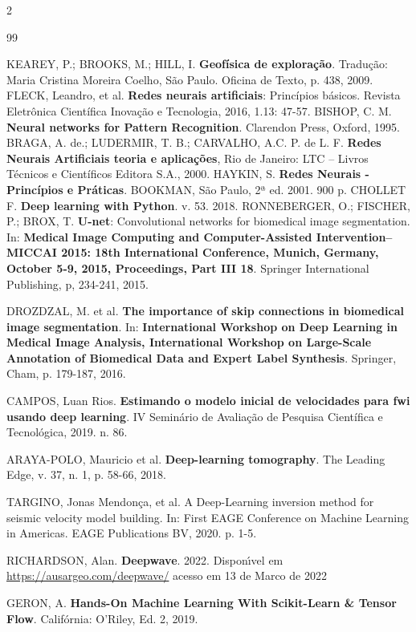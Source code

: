 \documentclass[a4paper,twoside,12pt]{article}
\begin{document}
\begin{multicols}{2}
\begin{thebibliography}{99}

 KEAREY, P.; BROOKS, M.; HILL, I. \textbf{Geofísica de exploração}. Tradução: Maria Cristina Moreira Coelho, São Paulo. Oficina de Texto, p. 438, 2009.
FLECK, Leandro, et al. \textbf{Redes neurais artificiais}: Princípios básicos. Revista Eletrônica Científica Inovação e Tecnologia, 2016, 1.13: 47-57.
BISHOP, C. M. \textbf{Neural networks for Pattern Recognition}. Clarendon Press, Oxford, 1995.
BRAGA, A. de.; LUDERMIR, T. B.; CARVALHO, A.C. P. de L. F. \textbf{Redes Neurais Artificiais teoria e aplicações}, Rio de Janeiro: LTC – Livros Técnicos e Científicos Editora S.A., 2000.
HAYKIN, S. \textbf{Redes Neurais - Princípios e Práticas}. BOOKMAN, São Paulo, 2ª ed. 2001. 900 p.
 CHOLLET F. \textbf{Deep learning with Python}. v. 53. 2018.
 RONNEBERGER, O.; FISCHER, P.; BROX, T. \textbf{U-net}: Convolutional networks for biomedical image segmentation. In: \textbf{Medical Image Computing and Computer-Assisted Intervention–MICCAI 2015: 18th International Conference, Munich, Germany, October 5-9, 2015, Proceedings, Part III 18}. Springer International Publishing, p, 234-241, 2015.

 DROZDZAL, M. et al. \textbf{The importance of skip connections in biomedical image segmentation}. In: \textbf{International Workshop on Deep Learning in Medical Image Analysis, International Workshop on Large-Scale Annotation of Biomedical Data and Expert Label Synthesis}. Springer, Cham, p. 179-187, 2016.  

CAMPOS, Luan Rios. \textbf{Estimando o modelo inicial de velocidades para fwi usando deep learning}. IV Seminário de Avaliação de Pesquisa Científica e Tecnológica, 2019. n. 86.



ARAYA-POLO, Mauricio et al. \textbf{Deep-learning tomography}. The Leading Edge, v. 37, n. 1, p. 58-66, 2018.

TARGINO, Jonas Mendonça, et al. A Deep-Learning inversion method for seismic velocity model building. In: First EAGE Conference on Machine Learning in Americas. EAGE Publications BV, 2020. p. 1-5.



 RICHARDSON, Alan. \textbf{Deepwave}. 2022. Dispon{\'\i}vel em \url{https://ausargeo.com/deepwave/} acesso em 13 de Marco de 2022


 GERON, A. \textbf{Hands-On Machine Learning With Scikit-Learn \& Tensor Flow}. Califórnia: O'Riley, Ed. 2, 2019.


\end{thebibliography} 
\end{multicols}
\end{document}
